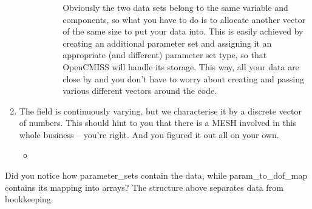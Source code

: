 \begin{enumerate}
\begin{itemize}
\begin{itemize}
\begin{itemize}
      Obviously the two data sets belong to the same variable and components, so what you have to do is to allocate
      another vector of the same size to put your data into. This is easily achieved by creating an additional 
      parameter set and assigning it an appropriate (and different) parameter set type, so that OpenCMISS will handle
      its storage. This way, all your data are close by and you don't have to worry about creating and passing various 
      different vectors around the code.
      \end{itemize} %
    \end{itemize} %
  \end{itemize}%
\item The field is continuously varying, but we characterise it by a discrete vector of numbers. This should hint to 
you that there is a \textsf{MESH} involved in this whole business -- you're right. And you figured it out all on your own.
  \begin{itemize}
  \item 
  \end{itemize}


\end{enumerate}%

Did you notice how parameter\_sets contain the data, while param\_to\_dof\_map contains its mapping into arrays? The 
structure above separates data from bookkeeping. 













